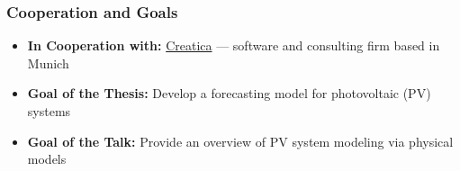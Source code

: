 \begin{frame}
    \frametitle{Cooperation and Goals}
    \begin{itemize}
        \item \textbf{In Cooperation with:} \href{https://www.creatica.de}{Creatica} — software and consulting firm based in Munich
        \item \textbf{Goal of the Thesis:} Develop a forecasting model for photovoltaic (PV) systems
        \item \textbf{Goal of the Talk:} Provide an overview of PV system modeling via physical models
    \end{itemize}
\end{frame}